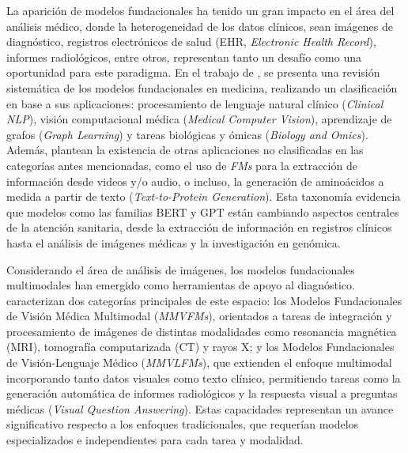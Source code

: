 La aparición de modelos fundacionales ha tenido un gran impacto en el área del análisis médico, donde la 
heterogeneidad de los datos clínicos, sean imágenes de diagnóstico, registros electrónicos de salud (EHR, \textit{Electronic Health Record}),
informes radiológicos, entre otros, representan tanto un desafío como una oportunidad para este paradigma. 
En el trabajo de \textcite{Khan2026}, se presenta una revisión sistemática de los modelos fundacionales en medicina,
realizando un clasificación en base a sus aplicaciones: procesamiento de lenguaje natural clínico (\textit{Clinical NLP}), 
visión computacional médica (\textit{Medical Computer Vision}), aprendizaje de grafos (\textit{Graph Learning}) y 
tareas biológicas y ómicas (\textit{Biology and Omics}). Además, plantean la existencia de otras aplicaciones no clasificadas
en las categorías antes mencionadas, como el uso de \textit{FMs} para la extracción de información desde videos y/o audio, o incluso,
la generación de aminoácidos a medida a partir de texto (\textit{Text-to-Protein Generation}). 
Esta taxonomía evidencia que modelos como las familias BERT y GPT están cambiando aspectos centrales 
de la atención sanitaria, desde la extracción de información en registros clínicos hasta el análisis de 
imágenes médicas y la investigación en genómica.

Considerando el área de análisis de imágenes, los modelos fundacionales multimodales han emergido como
herramientas de apoyo al diagnóstico. \textcite{SUN2025103265} caracterizan dos categorías principales de este espacio:
los Modelos Fundacionales de Visión Médica Multimodal
(\textit{MMVFMs}), orientados a tareas de integración y procesamiento de
imágenes de distintas modalidades como resonancia magnética (MRI), tomografía
computarizada (CT) y rayos X; y los Modelos Fundacionales de Visión-Lenguaje
Médico (\textit{MMVLFMs}), que extienden el enfoque multimodal incorporando
tanto datos visuales como texto clínico, permitiendo tareas como la generación
automática de informes radiológicos y la respuesta visual a preguntas médicas
(\textit{Visual Question Answering}). Estas capacidades representan un avance
significativo respecto a los enfoques tradicionales, que requerían modelos
especializados e independientes para cada tarea y modalidad.


